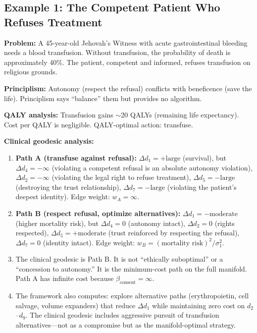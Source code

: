 \documentclass[12pt]{article}
\theoremstyle{definition}
\theoremstyle{remark}
\begin{document}
\subsection{Example 1: The Competent Patient Who Refuses Treatment}

\textbf{Problem:} A 45-year-old Jehovah's Witness with acute gastrointestinal bleeding needs a blood transfusion.  Without transfusion, the probability of death is approximately 40\%.  The patient, competent and informed, refuses transfusion on religious grounds.

\textbf{Principlism:} Autonomy (respect the refusal) conflicts with beneficence (save the life).  Principlism says ``balance'' them but provides no algorithm.

\textbf{QALY analysis:} Transfusion gains $\sim$20 QALYs (remaining life expectancy).  Cost per QALY is negligible.  QALY-optimal action: transfuse.

\textbf{Clinical geodesic analysis:}
\begin{enumerate}
    \item \textbf{Path A (transfuse against refusal):} $\Delta d_1 = +\text{large}$ (survival), but $\Delta d_4 = -\infty$ (violating a competent refusal is an absolute autonomy violation), $\Delta d_2 = -\infty$ (violating the legal right to refuse treatment), $\Delta d_5 = -\text{large}$ (destroying the trust relationship), $\Delta d_7 = -\text{large}$ (violating the patient's deepest identity).  Edge weight: $w_A = \infty$.
    \item \textbf{Path B (respect refusal, optimize alternatives):} $\Delta d_1 = -\text{moderate}$ (higher mortality risk), but $\Delta d_4 = 0$ (autonomy intact), $\Delta d_2 = 0$ (rights respected), $\Delta d_5 = +\text{moderate}$ (trust reinforced by respecting the refusal), $\Delta d_7 = 0$ (identity intact).  Edge weight: $w_B = (\text{mortality risk})^2 / \sigma_1^2$.
    \item The clinical geodesic is Path B.  It is not ``ethically suboptimal'' or a ``concession to autonomy.''  It is the minimum-cost path on the full manifold.  Path A has infinite cost because $\beta_{\text{consent}} = \infty$.
    \item The framework also computes: explore alternative paths (erythropoietin, cell salvage, volume expanders) that reduce $\Delta d_1$ while maintaining zero cost on $d_2$--$d_9$.  The clinical geodesic includes aggressive pursuit of transfusion alternatives---not as a compromise but as the manifold-optimal strategy.
\end{enumerate}
\end{document}
